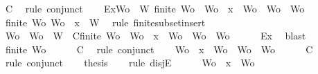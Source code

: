 \begin{isabellebody}
\ C{}\ \isamarkupfalse%
\ {\isacharparenleft}rule\ conjunct{}{\isacharparenright}\isanewline
\ \ \isamarkupfalse%
\ Ex{}{\isacharcolon}{\isachardoublequoteopen}{\isasymexists}Wo\ {\isasymsubseteq}\ W{\isachardot}\ finite\ Wo\ {\isasymand}\ {\isacharparenleft}Wo{\isacharprime}\ {\isacharequal}\ {\isacharbraceleft}x{\isacharbraceright}\ {\isasymunion}\ Wo\ {\isasymor}\ Wo{\isacharprime}\ {\isacharequal}\ Wo{\isacharparenright}{\isachardoublequoteclose}\isanewline
\ \ \ \ \isamarkupfalse%
\ {\isacartoucheopen}finite\ Wo{\isacharprime}{\isacartoucheclose}\ {\isacartoucheopen}Wo{\isacharprime}\ {\isasymsubseteq}\ {\isacharbraceleft}x{\isacharbraceright}\ {\isasymunion}\ W{\isacartoucheclose}\ \isamarkupfalse%
\ {\isacharparenleft}rule\ finite{\isacharunderscore}subset{\isacharunderscore}insert{}{\isacharparenright}\isanewline
\ \ \isamarkupfalse%
\ Wo\ \ {\isachardoublequoteopen}Wo\ {\isasymsubseteq}\ W{\isachardoublequoteclose}\ \ C{}{\isacharcolon}{\isachardoublequoteopen}finite\ Wo\ {\isasymand}\ {\isacharparenleft}Wo{\isacharprime}\ {\isacharequal}\ {\isacharbraceleft}x{\isacharbraceright}\ {\isasymunion}\ Wo\ {\isasymor}\ Wo{\isacharprime}\ {\isacharequal}\ Wo{\isacharparenright}{\isachardoublequoteclose}\isanewline
\ \ \ \ \isamarkupfalse%
\ Ex{}\ \isamarkupfalse%
\ blast\isanewline
\ \ \isamarkupfalse%
\ {\isachardoublequoteopen}finite\ Wo{\isachardoublequoteclose}\isanewline
\ \ \ \ \isamarkupfalse%
\ C{}\ \isamarkupfalse%
\ {\isacharparenleft}rule\ conjunct{}{\isacharparenright}\isanewline
\ \ \isamarkupfalse%
\ {\isachardoublequoteopen}Wo{\isacharprime}\ {\isacharequal}\ {\isacharbraceleft}x{\isacharbraceright}\ {\isasymunion}\ Wo\ {\isasymor}\ Wo{\isacharprime}\ {\isacharequal}\ Wo{\isachardoublequoteclose}\isanewline
\ \ \ \ \isamarkupfalse%
\ C{}\ \isamarkupfalse%
\ {\isacharparenleft}rule\ conjunct{}{\isacharparenright}\isanewline
\ \ \isamarkupfalse%
\ {\isacharquery}thesis\isanewline
\ \ \isamarkupfalse%
\ {\isacharparenleft}rule\ disjE{\isacharparenright}\isanewline
\ \ \ \ \isamarkupfalse%
\ {\isachardoublequoteopen}Wo{\isacharprime}\ {\isacharequal}\ {\isacharbraceleft}x{\isacharbraceright}\ {\isasymunion}\ Wo{\isachardoublequoteclose}\isanewline

\end{isabellebody}
